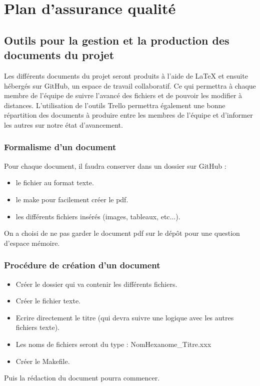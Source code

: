 \chapter{Plan d'assurance qualité}

\section{Outils pour la gestion et la production des documents du projet}

    Les différents documents du projet seront produits à  l'aide de LaTeX et ensuite hébergés sur GitHub, un espace de travail collaboratif. Ce qui permettra à  chaque membre de l'équipe de suivre l'avancé des fichiers et de pouvoir les modifier à  distances.
    L'utilisation de l'outils Trello permettra également une bonne répartition des documents à produire entre les membres de l'équipe et d'informer les autres sur notre état d'avancement.

\subsection{Formalisme d'un document}

Pour chaque document, il faudra conserver dans un dossier sur GitHub :
\begin{itemize}
    \item le fichier au format texte.
    \item le make pour facilement créer le pdf.
    \item les différents fichiers insérés (images, tableaux, etc...).
\end{itemize}
On a choisi de ne pas garder le document pdf sur le dépôt pour une question d'espace mémoire.
\subsection{Procédure de création d'un document}

\begin{itemize}
    \item Créer le dossier qui va contenir les différents fichiers.
    \item Créer le fichier texte.
    \item Ecrire directement le titre (qui devra suivre une logique avec les autres fichiers texte).
    \item Les noms de fichiers seront du type : NomHexanome\_Titre.xxx
   \item Créer le Makefile.
\end{itemize}
Puis la rédaction du document pourra commencer.

